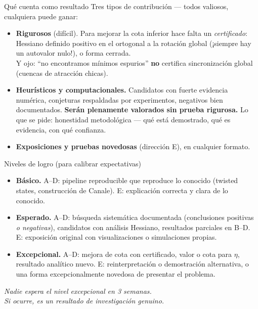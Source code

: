 \documentclass[10pt,aspectratio=169]{beamer}
\begin{document}
\begin{frame}{Qué cuenta como resultado}
Tres tipos de contribución --- todos valiosos, cualquiera puede ganar:
\medskip
\begin{itemize}
    \item \textbf{Rigurosos} (difícil). Para mejorar la cota inferior hace falta un \emph{certificado}: Hessiano definido positivo en el ortogonal a la rotación global (¡siempre hay un autovalor nulo!), o forma cerrada.\\
    Y ojo: ``no encontramos mínimos espurios'' \textbf{no} certifica sincronización global (cuencas de atracción chicas).
    \pause
    \item \textbf{Heurísticos y computacionales.} Candidatos con fuerte evidencia numérica, conjeturas respaldadas por experimentos, negativos bien documentados. \textbf{Serán plenamente valorados sin prueba rigurosa.} Lo que se pide: honestidad metodológica --- qué está demostrado, qué es evidencia, con qué confianza.
    \pause
    \item \textbf{Exposiciones y pruebas novedosas} (dirección E), en cualquier formato.
\end{itemize}
\end{frame}

\begin{frame}{Niveles de logro (para calibrar expectativas)}
\begin{itemize}
    \item \textbf{Básico.} A--D: pipeline reproducible que reproduce lo conocido (twisted states, construcción de Canale). E: explicación correcta y clara de lo conocido.
    \item \textbf{Esperado.} A--D: búsqueda sistemática documentada (conclusiones positivas \emph{o negativas}), candidatos con análisis Hessiano, resultados parciales en B--D. E: exposición original con visualizaciones o simulaciones propias.
    \item \textbf{Excepcional.} A--D: mejora de cota con certificado, valor o cota para $\eta$, resultado analítico nuevo. E: reinterpretación o demostración alternativa, o una forma excepcionalmente novedosa de presentar el problema.
\end{itemize}
\medskip
\pause
\begin{center}
\emph{Nadie espera el nivel excepcional en 3 semanas.\\ Si ocurre, es un resultado de investigación genuino.}
\end{center}
\end{frame}
\end{document}
